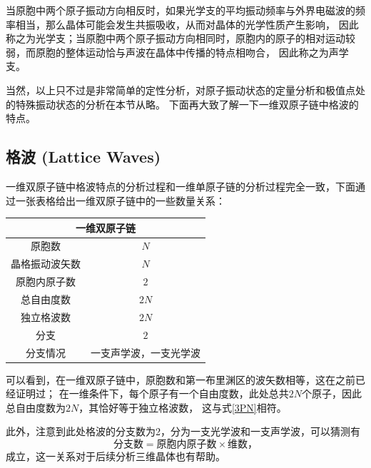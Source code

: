 \documentclass[declarePage]{ecnuthesis}
\begin{document}
当原胞中两个原子振动方向相反时，如果光学支的平均振动频率与外界电磁波的频率相当，那么晶体可能会发生共振吸收，从而对晶体的光学性质产生影响，%
因此称之为光学支；当原胞中两个原子振动方向相同时，原胞内的原子的相对运动较弱，而原胞的整体运动恰与声波在晶体中传播的特点相吻合，%
因此称之为声学支。

当然，以上只不过是非常简单的定性分析，对原子振动状态的定量分析和极值点处的特殊振动状态的分析在本节从略。%
下面再大致了解一下一维双原子链中格波的特点。

\subsection{格波 (Lattice Waves)}

一维双原子链中格波特点的分析过程和一维单原子链的分析过程完全一致，下面通过一张表格给出一维双原子链中的一些数量关系：
\begin{table}[htb]
    \centering
    \begin{tabular}{|c|c|}
        \hline
        \multicolumn{2}{|c|}{一维双原子链}  \\ 
        \hline
        原胞数        & $N$                 \\ 
        \hline
        晶格振动波矢数 & $N$                 \\ 
        \hline
        原胞内原子数   & $2$                 \\ 
        \hline
        总自由度数     & $2N$                \\ 
        \hline
        独立格波数     & $2N$                \\ 
        \hline
        分支          & $2$                 \\ 
        \hline
        分支情况      & 一支声学波，一支光学波\\ 
        \hline
    \end{tabular}
\end{table}

可以看到，在一维双原子链中，原胞数和第一布里渊区的波矢数相等，这在之前已经证明过；%
在一维条件下，每个原子有一个自由度数，此处总共$2N$个原子，因此总自由度数为$2N$，其恰好等于独立格波数，%
这与式\ref{3PN}相符。

此外，注意到此处格波的分支数为2，分为一支光学波和一支声学波，可以猜测有
\begin{equation}
    \text{分支数} = \text{原胞内原子数} \times \text{维数，} \label{Bran}
\end{equation}
成立，这一关系对于后续分析三维晶体也有帮助。
\end{document}
